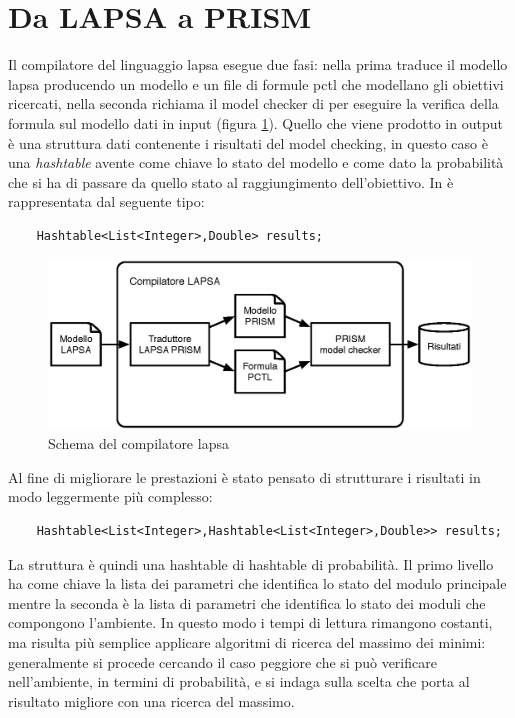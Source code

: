 \section{Da LAPSA a PRISM}
Il compilatore del linguaggio \ac{lapsa} esegue due fasi: nella prima traduce il modello \ac{lapsa} producendo un modello \prism{} e un file di formule \ac{pctl} che modellano gli obiettivi ricercati, nella seconda richiama il model checker di \prism{} per eseguire la verifica della formula sul modello dati in input (figura \ref{fig:lapsa:compiler}). Quello che viene prodotto in output è una struttura dati contenente i risultati del model checking, in questo caso è una \emph{hashtable} avente come chiave lo stato del modello e come dato la probabilità che si ha di passare da quello stato al raggiungimento dell'obiettivo. In \java{} è rappresentata dal seguente tipo:
\begin{verbatim}
	Hashtable<List<Integer>,Double> results;
\end{verbatim}

\begin{figure}[htbp!]
	\begin{centering}
		\includegraphics[width=\textwidth]{Images/lapsa}
	\end{centering}
	\caption{Schema del compilatore \acs{lapsa}}
	\label{fig:lapsa:compiler}
\end{figure}

Al fine di migliorare le prestazioni è stato pensato di strutturare i risultati in modo leggermente più complesso:
\begin{verbatim}
	Hashtable<List<Integer>,Hashtable<List<Integer>,Double>> results;
\end{verbatim}
La struttura è quindi una hashtable di hashtable di probabilità. Il primo livello ha come chiave la lista dei parametri che identifica lo stato del modulo principale mentre la seconda è la lista di parametri che identifica lo stato dei moduli che compongono l'ambiente. In questo modo i tempi di lettura rimangono costanti, ma risulta più semplice applicare algoritmi di ricerca del massimo dei minimi: generalmente si procede cercando il caso peggiore che si può verificare nell'ambiente, in termini di probabilità, e si indaga sulla scelta che porta al risultato migliore con una ricerca del massimo.

